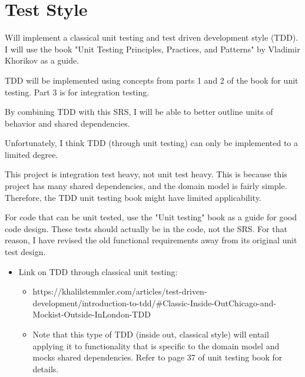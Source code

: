 \section{Test Style}

Will implement a classical unit testing and test driven development style (TDD). I will use the book "Unit Testing Principles, Practices, and Patterns" by Vladimir Khorikov as a guide.

TDD will be implemented using concepts from parts 1 and 2 of the book for unit testing. Part 3 is for integration testing.

By combining TDD with this SRS, I will be able to better outline units of behavior and shared dependencies.

Unfortunately, I think TDD (through unit testing) can only be implemented to a limited degree.

This project is integration test heavy, not unit test heavy. This is because this project has many shared dependencies, and the domain model is fairly simple. Therefore, the TDD unit testing book might have limited applicability. 

For code that can be unit tested, use the "Unit testing" book as a guide for good code design. These tests should actually be in the code, not the SRS. For that reason, I have revised the old functional requirements away from its original unit test design.


\begin{itemize}
\item Link on TDD through classical unit testing:
	\begin{itemize}
	\item https://khalilstemmler.com/articles/test-driven-development/introduction-to-tdd/\#Classic-Inside-OutChicago-and-Mockist-Outside-InLondon-TDD 
	\item Note that this type of TDD (inside out, classical style) will entail applying it to functionality that is specific to the domain model and mocks shared dependencies. Refer to page 37 of unit testing book for details. 
	\end{itemize}
\end{itemize}

